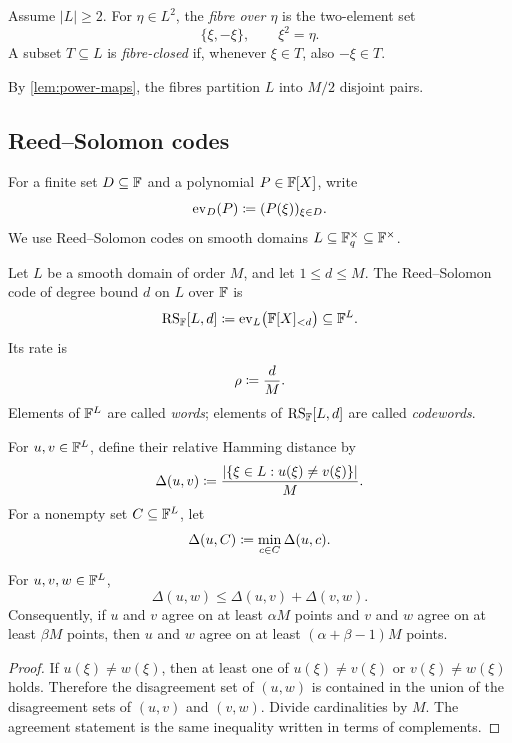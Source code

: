 \begin{definition}[Fibres]
\label{def:fibres}
Assume $|L|\ge2$.  For $\eta\in L^2$, the \emph{fibre over $\eta$} is the two-element set
\[
  \{\xi,-\xi\},
  \qquad \xi^2=\eta.
\]
A subset $T\subseteq L$ is \emph{fibre-closed} if, whenever $\xi\in T$, also $-\xi\in T$.
\end{definition}

By \cref{lem:power-maps}, the fibres partition $L$ into $M/2$ disjoint pairs.

\subsection{Reed--Solomon codes}
\label{sec:preliminaries-rs}

For a finite set $D\subseteq\mathbb{F}$ and a polynomial $P\in\mathbb{F}[X]$, write
\[
  \operatorname{ev}_D(P)\coloneqq(P(\xi))_{\xi\in D}.
\]
We use Reed--Solomon codes on smooth domains $L\subseteq\mathbb{F}_q^\times\subseteq\mathbb{F}^\times$.

\begin{definition}
\label{def:rs-code}
Let $L$ be a smooth domain of order $M$, and let $1\le d\le M$.  The Reed--Solomon code of degree bound $d$ on $L$ over $\mathbb{F}$ is
\[
  \operatorname{RS}_{\mathbb{F}}[L,d]
  \coloneqq
  \operatorname{ev}_L\bigl(\mathbb{F}[X]_{<d}\bigr)
  \subseteq\mathbb{F}^L.
\]
Its rate is
\[
  \rho\coloneqq\frac dM.
\]
Elements of $\mathbb{F}^L$ are called \emph{words}; elements of $\operatorname{RS}_{\mathbb{F}}[L,d]$ are called \emph{codewords}.
\end{definition}

For $u,v\in\mathbb{F}^L$, define their relative Hamming distance by
\[
  \Delta(u,v)
  \coloneqq
  \frac{|\{\xi\in L:u(\xi)\ne v(\xi)\}|}{M}.
\]
For a nonempty set $C\subseteq\mathbb{F}^L$, let
\[
  \Delta(u,C)\coloneqq\min_{c\in C}\Delta(u,c).
\]

\begin{lemma}
\label{lem:hamming-triangle}
For $u,v,w\in\mathbb{F}^L$,
\[
  \Delta(u,w)\le\Delta(u,v)+\Delta(v,w).
\]
Consequently, if $u$ and $v$ agree on at least $\alpha M$ points and $v$ and $w$ agree on at least $\beta M$ points, then $u$ and $w$ agree on at least $(\alpha+\beta-1)M$ points.
\end{lemma}

\begin{proof}
If $u(\xi)\ne w(\xi)$, then at least one of $u(\xi)\ne v(\xi)$ or $v(\xi)\ne w(\xi)$ holds.  Therefore the disagreement set of $(u,w)$ is contained in the union of the disagreement sets of $(u,v)$ and $(v,w)$.  Divide cardinalities by $M$.  The agreement statement is the same inequality written in terms of complements.
\end{proof}

